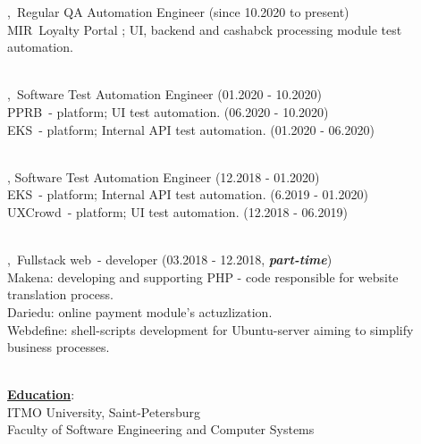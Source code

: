 \documentclass[hidelinks,12pt,a4paper,oneside]{article}
\newcommand*\simpleruleline[1]{\par\noindent\raisebox{.8ex}{\makebox[\linewidth]{\hrulefill\hspace{#1}}}}
\newcommand*\tqs{\textquotesingle}
\begin{document}
\begin{addmargin}[1em]{2em}%
\vspace{11px}
{\large
\tqs \href{https://www.luxoft.com/}{}\tqs,\ Regular QA Automation Engineer {\small(since 10.2020 to present)}} \\
\textcolor{marengo} {
	{\small \tqs MIR\tqs\ Loyalty Portal ;  UI, backend and cashabck processing module test automation.}
}
\simpleruleline{6ex} \\
{\large
\tqs \href{https://www.sberbank.ru/}{}\tqs,\ Software Test Automation Engineer {\small(01.2020 - 10.2020)}} \\
\textcolor{marengo} {
	{\small \tqs PPRB\tqs\ - platform; UI test automation.}  {\scriptsize (06.2020 - 10.2020)} \\
	{\small \tqs EKS\tqs\ - platform; Internal API test automation.} {\scriptsize (01.2020 - 06.2020)}
}
\simpleruleline{6ex} \\
{\large
\tqs \href{https://www.performance-lab.ru/}{}\tqs, Software Test Automation Engineer {\small(12.2018 - 01.2020)}} \\
\textcolor{marengo} {
	{\small \tqs EKS\tqs\ - platform; Internal API test automation.} {\scriptsize (6.2019 - 01.2020)} \\
	{\small \tqs UXCrowd\tqs\ - platform; UI test automation.} {\scriptsize (12.2018 - 06.2019)}
}
\simpleruleline{6ex} \\
{\large
\tqs \href{https://webdefine.net/}{}\tqs,\ Fullstack web\ - developer {\small(03.2018 - 12.2018, \emph{\textbf{part-time}})}} \\
\textcolor{marengo} {
	{\small \tqs Makena\tqs: developing and supporting PHP - code responsible for website translation process.} \\
	{\small \tqs Dariedu\tqs: online payment module's actuzlization.} \\
	{\small \tqs Webdefine\tqs:  shell-scripts development for Ubuntu-server aiming to simplify business processes.}
}
\end{addmargin}
\vspace{-12px}
\ \\
{\Large \underline{\textbf{Education}}}: \\ [8px]
{\large ITMO University, Saint-Petersburg} \\
Faculty of Software Engineering and Computer Systems
\end{document}
